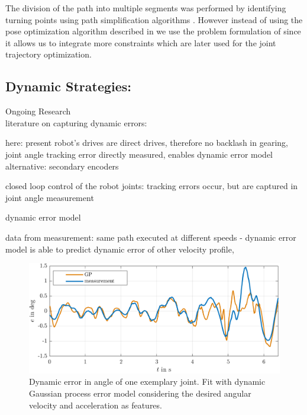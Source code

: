 \documentclass[5p,times,procedia]{elsarticle}
\begin{document}
The division of the path into multiple segments was performed by identifying turning points using path simplification algorithms \cite{stroke_division}.
However instead of using the pose optimization algorithm described in \cite{stroke_division} we use the problem formulation of \cite{previous_work} since it allows us to integrate more constraints which are later used for the joint trajectory optimization.






\subsection{Dynamic Strategies:} Ongoing Research \\
literature on capturing dynamic errors:

here: present robot's drives are direct drives, therefore no backlash in gearing, joint angle tracking error directly measured, 
enables dynamic error model
alternative: secondary encoders~\cite{Mesmer22}

closed loop control of the robot joints: tracking errors occur, but are captured in joint angle measurement

dynamic error model

data from measurement: same path executed at different speeds - dynamic error model is able to predict dynamic error of other velocity profile,

\begin{figure}[h]
	\centering
	\includegraphics[width=\columnwidth]{graphics/GP_eOf_dqDes_ddqDes_trainedOnFastestAndSlowest.png}
	\caption{Dynamic error in angle of one exemplary joint. Fit with dynamic Gaussian process error model considering the desired angular velocity and acceleration as features.}
	\label{fig:error_sources}
\end{figure}
\end{document}
